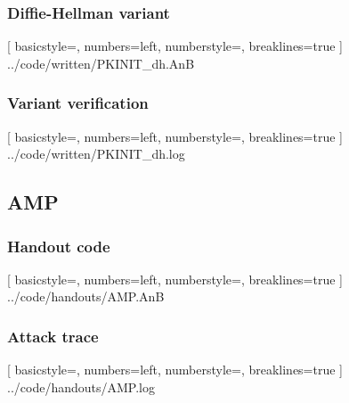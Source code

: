 \documentclass{article}
\begin{document}
\subsubsection{Diffie-Hellman variant}
\label{app:pkdh}

	[
		basicstyle=\footnotesize,
		numbers=left,
		numberstyle=\tiny,
		breaklines=true
	]
	{../code/written/PKINIT_dh.AnB}

\subsubsection{Variant verification}
\label{app:pkdh-log}

	[
		basicstyle=\footnotesize,
		numbers=left,
		numberstyle=\tiny,
		breaklines=true
	]
	{../code/written/PKINIT_dh.log}
	
\subsection{AMP}

\subsubsection{Handout code}

	[
		basicstyle=\footnotesize,
		numbers=left,
		numberstyle=\tiny,
		breaklines=true
	]
	{../code/handouts/AMP.AnB}

\subsubsection{Attack trace}
\label{app:amptrace}

	[
		basicstyle=\footnotesize,
		numbers=left,
		numberstyle=\tiny,
		breaklines=true
	]
	{../code/handouts/AMP.log}
\end{document}

